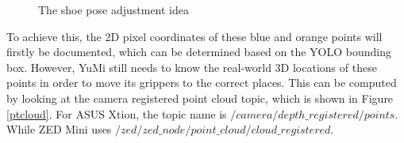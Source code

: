 \begin{figure}[H]
\centering
{}
\caption{The shoe pose adjustment idea}
\label{adjustmentidea}
\end{figure}

To achieve this, the 2D pixel coordinates of these blue and orange points will firstly be documented, which can be determined based on the YOLO bounding box. However, YuMi still needs to know the real-world 3D locations of these points in order to move its grippers to the correct places. This can be computed by looking at the camera registered point cloud topic, which is shown in Figure \ref{ptcloud}. For ASUS Xtion, the topic name is $/camera/depth\_registered/points$. While ZED Mini uses $/zed\slash zed\_node\slash point\_cloud\slash cloud\_registered$.

